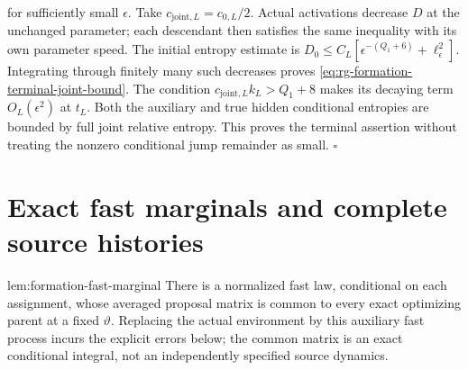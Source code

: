 for sufficiently small $\epsilon$.
Take $c_{\mathrm{joint},L}=c_{0,L}/2$. Actual activations decrease
$D$ at the unchanged parameter; each descendant then satisfies the
same inequality with its own parameter speed.
The initial entropy estimate is
$D_0\le C_L[\epsilon^{-(Q_1+6)}+\ell_\epsilon^2]$.
Integrating through finitely many such decreases proves
\cref{eq:rg-formation-terminal-joint-bound}.
The condition $c_{\mathrm{joint},L}k_L>Q_1+8$ makes its decaying
term $O_L(\epsilon^2)$ at $t_L$.
Both the auxiliary and true hidden conditional entropies are
bounded by full joint relative entropy. This proves the terminal
assertion without treating the nonzero conditional jump remainder
as small. \hfill$\square$

\section{Exact fast marginals and complete source histories}
\label{sec:rg-formation-history-proof}

{lem:formation-fast-marginal}
There is a normalized fast law, conditional on each assignment,
whose averaged proposal matrix is common to every exact optimizing
parent at a fixed $\vartheta$. Replacing the actual environment by
this auxiliary fast process incurs the explicit errors below; the
common matrix is an exact conditional integral, not an independently
specified source dynamics. 

